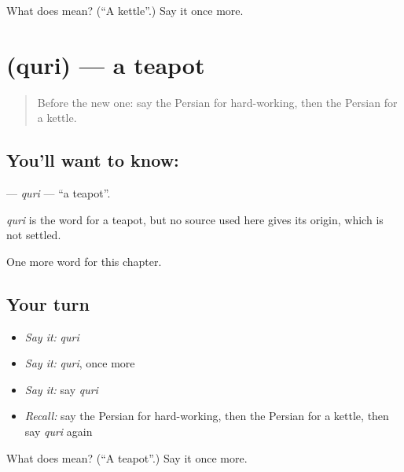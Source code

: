 \begin{tcolorbox}[breakable,colback=teal!4,colframe=teal!35!black,title={Before you move on}]
What does  mean? (\textquotedblleft{}A kettle\textquotedblright{}.) Say it once more.
\end{tcolorbox}
\section[\texorpdfstring{\fa{قوری} (quri)}{قوری (quri)}]{ (quri) — a teapot}

\label{lesson:FA-C239-quri}



\begin{quote}
Before the new one: say the Persian for hard-working, then the Persian for a kettle.
\end{quote}

\subsection*{You'll want to know: }
\textbf{} — \emph{quri} — \textquotedblleft{}a teapot\textquotedblright{}.

\begin{cousinweb}
\emph{quri} is the word for a teapot, but no source used here gives its origin, which is not settled.
\end{cousinweb}

\begin{grammarlens}[title={What you've built}]
One more word for this chapter.
\end{grammarlens}

\subsection*{Your turn}
\begin{itemize}
\raggedright
  \item \emph{Say it:} \emph{quri}
  \item \emph{Say it:} \emph{quri}, once more
  \item \emph{Say it:} say \emph{quri}
  \item \emph{Recall:} say the Persian for hard-working, then the Persian for a kettle, then say \emph{quri} again
\end{itemize}

\begin{tcolorbox}[breakable,colback=teal!4,colframe=teal!35!black,title={Before you move on}]
What does  mean? (\textquotedblleft{}A teapot\textquotedblright{}.) Say it once more.
\end{tcolorbox}
